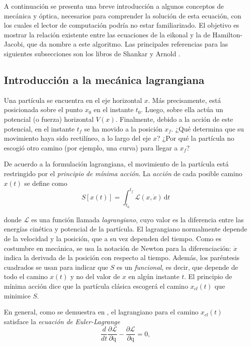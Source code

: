 A continuación se presenta una breve introducción a algunos conceptos de mecánica y óptica, necesarios para comprender la solución de esta ecuación, con los cuales el lector de computación podría no estar familiarizado. El objetivo es mostrar la relación existente entre las ecuaciones de la eikonal y la de Hamilton-Jacobi, que da nombre a este algoritmo. Las principales referencias para las siguientes subsecciones son los libros de Shankar \cite{shankar2012principles} y Arnold \cite{arnol2013mathematical}.

\subsection{Introducción a la mecánica lagrangiana}

Una partícula se encuentra en el eje horizontal $x$. Más precisamente, está posicionada sobre el punto $x_0$ en el instante $t_0$. Luego, sobre ella actúa un potencial (o fuerza) horizontal $V(x)$. Finalmente, debido a la acción de este potencial, en el instante $t_f$ se ha movido a la posición $x_f$. ¿Qué determina que su movimiento haya sido rectilíneo, a lo largo del eje $x$? ¿Por qué la partícula no escogió otro camino (por ejemplo, una curva) para llegar a $x_f$?

De acuerdo a la formulación lagrangiana, el movimiento de la partícula está restringido por el \textit{principio de mínima acción}. La \textit{acción} de cada posible camino $x(t)$ se define como
\begin{equation}
S[x(t)] = \int_{t_0}^{t_f} \! \mathcal{L}(x, \dot{x}) \, \mathrm{d}t
\end{equation}

\noindent
donde $\mathcal{L}$ es una función llamada \textit{lagrangiano}, cuyo valor es la diferencia entre las energías cinética y potencial de la partícula. El lagrangiano normalmente depende de la velocidad y la posición, que a su vez dependen del tiempo. Como es costumbre en mecánica, se usa la notación de Newton para la diferenciación: $\dot{x}$ indica la derivada de la posición con respecto al tiempo. Además, los paréntesis cuadrados se usan para indicar que $S$ es un \textit{funcional}, es decir, que depende de todo el camino $x(t)$ y no del valor de $x$ en algún instante $t$. El principio de mínima acción dice que la partícula clásica escogerá el camino $x_{cl}(t)$ que minimice $S$.

En general, como se demuestra en \cite{shankar2012principles}, el lagrangiano para el camino $x_{cl}(t)$ satisface la \textit{ecuación de Euler-Lagrange}
\begin{equation}
\frac{d}{dt} \frac{\partial\mathcal{L}}{\partial \boldsymbol{\mathrm{\dot{q}}}} - \frac{\partial\mathcal{L}}{\partial\boldsymbol{\mathrm{q}}} = 0,
\end{equation}

